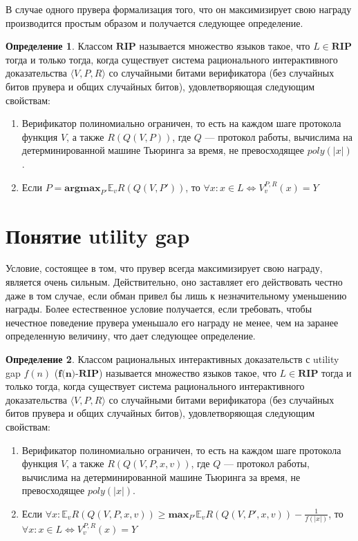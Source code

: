 \documentclass{mipt-thesis-bs}
\theoremstyle{plain}
\theoremstyle{definition}
\newtheorem{definition}{Определение}
\newcommand{\poly}{\textit{poly}}
\begin{document}
В случае одного прувера формализация того, что он максимизирует свою награду производится простым образом и получается следующее определение.
\begin{definition}\label{rip}
    Классом $\textbf{RIP}$ называется множество языков такое, что $L \in \textbf{RIP}$ тогда и только тогда, когда существует система рационального интерактивного доказательства $\langle V, P, R\rangle$ со случайными битами верификатора (без случайных битов прувера и общих случайных битов), удовлетворяющая следующим свойствам:
    \begin{enumerate}
        \item Верификатор полиномиально ограничен, то есть на каждом шаге протокола функция $V$, а также $R(Q(V, P))$, где $Q$ --- протокол работы, вычислима на детерминированной машине Тьюринга за время, не превосходящее $\poly(|x|)$.
    \item Если $P = \textbf{argmax}_{P'} \mathbb{E}_v R(Q(V, P'))$, то $\forall x: x \in L \iff V^{P, R}_{v}(x) = Y$
    \end{enumerate}
\end{definition}

\section{Понятие utility gap}

Условие, состоящее в том, что прувер всегда максимизирует свою награду, является очень сильным. Действительно, оно заставляет его действовать честно даже в том случае, если обман привел бы лишь к незначительному уменьшению награды. Более естественное условие получается, если требовать, чтобы нечестное поведение прувера уменьшало его награду не менее, чем на заранее определенную величину, что дает следующее определение.

\begin{definition}
    Классом рациональных интерактивных доказательств с utility gap $f(n)$ ($\textbf{f(n)-RIP}$) называется множество языков такое, что $L \in \textbf{RIP}$ тогда и только тогда, когда существует система рационального интерактивного доказательства $\langle V, P, R\rangle$ со случайными битами верификатора (без случайных битов прувера и общих случайных битов), удовлетворяющая следующим свойствам:
    \begin{enumerate}
        \item Верификатор полиномиально ограничен, то есть на каждом шаге протокола функция $V$, а также $R(Q(V, P, x, v))$, где $Q$ --- протокол работы, вычислима на детерминированной машине Тьюринга за время, не превосходящее $\poly(|x|)$.
        \item Если $\forall x: \mathbb{E}_v R(Q(V, P, x, v)) \geq \textbf{max}_{P'} \mathbb{E}_v R(Q(V, P', x, v)) - \frac{1}{f(|x|)}$, то $\forall x: x \in L \iff V^{P, R}_{v}(x) = Y$
        \end{enumerate}
    \end{definition}
\end{document}
